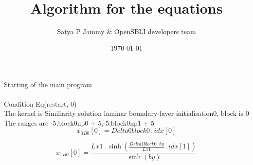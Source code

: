 \documentclass{article}
\title{Algorithm for the equations}
\author{Satya P Jammy \& OpenSBLI developers team}
\date{\today}
\begin{document}
\maketitle
\noindent Starting of the main program\\
\\\noindent Condition Eq(restart, 0)\\\noindent The kernel is Similiarity solution laminar boundary-layer initialisation0, block is 0\\\noindent The ranges are -5,block0np0 + 5,-5,block0np1 + 5\\\begin{dmath}{x_{0}{_{B0}}}[{0}] = Delta0block0 \,.\, {idx}[{0}]\end{dmath}

\begin{dmath}{x_{1}{_{B0}}}[{0}] = \frac{Lx1 \,.\, \sinh{\left (\frac{Delta1block0 \,.\, by}{Lx1} \,.\, {idx}[{1}] \right )}}{\sinh{\left (by \right )}}\end{dmath}
\end{document}
